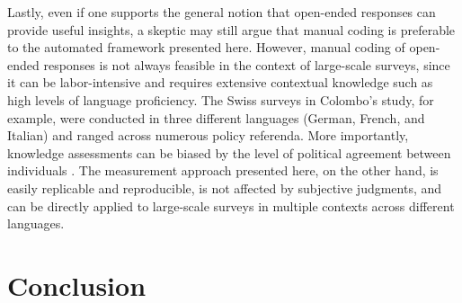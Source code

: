 
Lastly, even if one supports the general notion that open-ended responses can provide useful insights, a skeptic may still argue that manual coding is preferable to the automated framework presented here. However, manual coding of open-ended responses is not always feasible in the context of large-scale surveys, since it can be labor-intensive and requires extensive contextual knowledge such as high levels of language proficiency. The Swiss surveys in Colombo's \citeyearpar{colombo2016justifications} study, for example, were conducted in three different languages (German, French, and Italian) and ranged across numerous policy referenda. More importantly, knowledge assessments can be biased by the level of political agreement between individuals \citep[e.g.,][]{ryan2011accuracy}. The measurement approach presented here, on the other hand, is easily replicable and reproducible, is not affected by subjective judgments, and can be directly applied to large-scale surveys in multiple contexts across different languages.

\section*{Conclusion}

